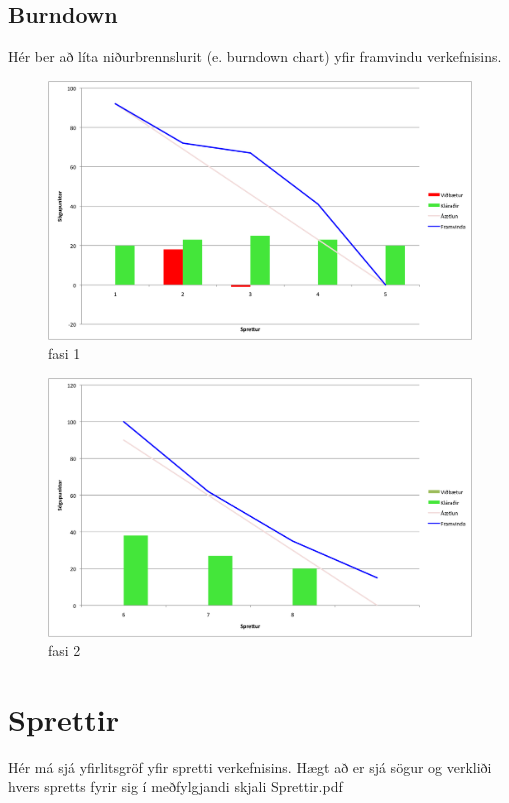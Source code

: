 \documentclass{article}
\begin{document}
\newpage

\subsection{Burndown}
Hér ber að líta niðurbrennslurit (e. burndown chart) yfir framvindu verkefnisins.

\begin{figure}[H]
  \centering
  \includegraphics[width=1\textwidth]{Fasi1_burndown.png} 
  \caption{fasi 1} 
\end{figure}

\begin{figure}[H]
  \centering
  \includegraphics[width=1\textwidth]{Fasi2_burndown.png} 
  \caption{fasi 2} 
\end{figure}

\newpage
\section{Sprettir}
Hér má sjá yfirlitsgröf yfir spretti verkefnisins. Hægt að er sjá sögur og verkliði hvers spretts fyrir sig í meðfylgjandi skjali Sprettir.pdf
\end{document}
